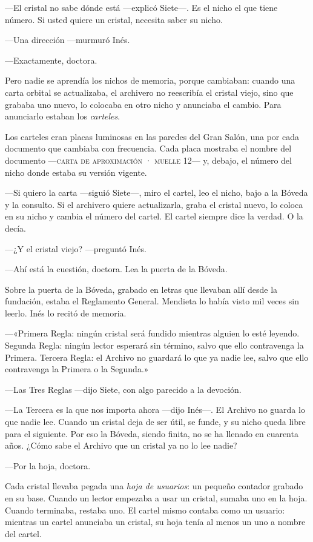 ---El cristal no sabe dónde está ---explicó Siete---\nobreak. Es el nicho el que tiene número. Si usted quiere un cristal, necesita saber su nicho.

---Una dirección ---murmuró Inés.

---Exactamente, doctora.

Pero nadie se aprendía los nichos de memoria, porque cambiaban: cuando una carta orbital se actualizaba, el archivero no reescribía el cristal viejo, sino que grababa uno nuevo, lo colocaba en otro nicho y anunciaba el cambio. Para anunciarlo estaban los \emph{carteles}.

Los carteles eran placas luminosas en las paredes del Gran Salón, una por cada documento que cambiaba con frecuencia. Cada placa mostraba el nombre del documento ---\textsc{carta de aproximación · muelle 12}--- y, debajo, el número del nicho donde estaba su versión vigente.

---Si quiero la carta ---siguió Siete---\nobreak, miro el cartel, leo el nicho, bajo a la Bóveda y la consulto. Si el archivero quiere actualizarla, graba el cristal nuevo, lo coloca en su nicho y cambia el número del cartel. El cartel siempre dice la verdad. O la decía.

---¿Y el cristal viejo? ---preguntó Inés.

---Ahí está la cuestión, doctora. Lea la puerta de la Bóveda.

\escena
Sobre la puerta de la Bóveda, grabado en letras que llevaban allí desde la fundación, estaba el Reglamento General. Mendieta lo había visto mil veces sin leerlo. Inés lo recitó de memoria.

---«Primera Regla: ningún cristal será fundido mientras alguien lo esté leyendo. Segunda Regla: ningún lector esperará sin término, salvo que ello contravenga la Primera. Tercera Regla: el Archivo no guardará lo que ya nadie lee, salvo que ello contravenga la Primera o la Segunda.»

---Las Tres Reglas ---dijo Siete, con algo parecido a la devoción.

---La Tercera es la que nos importa ahora ---dijo Inés---\nobreak. El Archivo no guarda lo que nadie lee. Cuando un cristal deja de ser útil, se funde, y su nicho queda libre para el siguiente. Por eso la Bóveda, siendo finita, no se ha llenado en cuarenta años. ¿Cómo sabe el Archivo que un cristal ya no lo lee nadie?

---Por la hoja, doctora.

Cada cristal llevaba pegada una \emph{hoja de usuarios}: un pequeño contador grabado en su base. Cuando un lector empezaba a usar un cristal, sumaba uno en la hoja. Cuando terminaba, restaba uno. El cartel mismo contaba como un usuario: mientras un cartel anunciaba un cristal, su hoja tenía al menos un uno a nombre del cartel.

